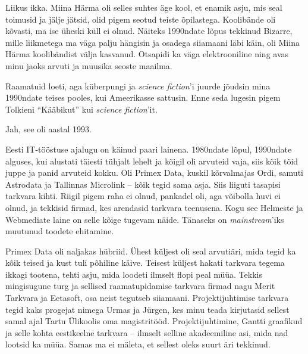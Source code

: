 
Liikus ikka. Miina Härma oli selles suhtes 
äge kool, et enamik asju, mis seal toimusid ja jälje jätsid, olid pigem 
seotud 
teiste õpilastega. Koolibände oli kõvasti, ma ise üheski küll ei olnud. 
Näiteks 1990ndate lõpus tekkinud Bizarre, mille liikmetega ma väga palju hängisin 
ja osadega 
siiamaani läbi käin, oli Miina Härma koolibändist välja kasvanud. Otsapidi ka väga elektrooniline ning avas minu jaoks arvuti 
ja muusika seoste maailma. 

Raamatuid loeti, aga küberpungi ja \emph{science fiction}'i 
juurde jõudsin mina 1990ndate teises pooles, kui Ameerikasse 
sattusin. Enne seda lugesin pigem Tolkieni \enquote{Kääbikut} kui 
\emph{science fiction}'it.


Jah, see oli aastal 1993.


Eesti IT-tööstuse ajalugu on käinud paari lainena. 
1980ndate lõpul, 1990ndate alguses, kui alustati 
täiesti tühjalt lehelt ja kõigil oli arvuteid vaja, siis kõik tõid juppe ja panid 
arvuteid kokku. Oli Primex Data, kuskil kõrvalmajas
Ordi, samuti Astrodata ja Tallinnas Microlink -- kõik tegid sama asja. Siis liiguti 
tasapisi tarkvara kihti. Riigil pigem raha ei olnud, pankadel oli, aga 
võibolla huvi ei olnud, ja tekkisid firmad, kes arendasid tarkvara teenusena. Kogu 
see Helmeste ja Webmediate laine on selle kõige tugevam näide. 
Tänaseks on \emph{mainstream}'iks muutunud toodete ehitamine. 

Primex Data oli naljakas hübriid. Ühest küljest oli seal arvutiäri, 
mida tegid ka kõik teised ja kust tuli põhiline käive. Teisest 
küljest hakati tarkvara tegema ikkagi tootena, tehti asju, mida loodeti ilmselt flopi peal müüa. Tekkis mingisugune turg ja sellised raamatupidamise tarkvara firmad nagu
Merit Tarkvara ja 
Eetasoft, 
osa neist tegutseb siiamaani. Projektijuhtimise tarkvara tegid kaks 
progejat nimega Urmas ja Jürgen, kes minu teada kirjutasid sellest samal ajal Tartu 
Ülikoolis oma magistritööd. Projektijuhtimine, Gantti graafikud ja selle kohta 
eestikeelne tarkvara -- ilmselt selline akadeemiline asi, mida nad 
lootsid ka müüa. Samas ma ei mäleta, et sellest oleks suurt äri 
tekkinud. 

